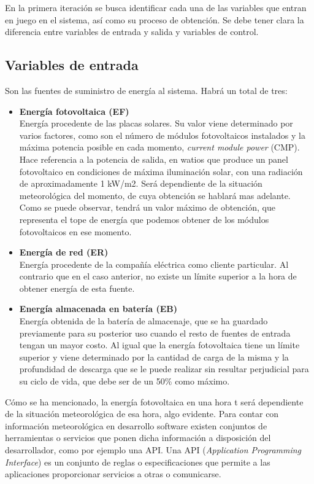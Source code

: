 En la primera iteración se busca identificar cada una de las variables que entran en juego en el sistema, así como su proceso de obtención. Se debe tener clara la diferencia entre variables de entrada y salida y variables de control.
\subsection{Variables de entrada}
Son las fuentes de suministro de energía al sistema. Habrá un total de tres:
\begin{itemize}
	\item \textbf{Energía fotovoltaica (EF)}\\ Energía procedente de las placas solares. Su valor viene determinado por varios factores, como son el número de módulos fotovoltaicos instalados y la máxima potencia posible en cada momento, \textit{current module power} (CMP). Hace referencia a la potencia de salida, en watios que produce un panel fotovoltaico en condiciones de máxima iluminación solar, con una radiación de aproximadamente 1 kW/m2. Será dependiente de la situación meteorológica del momento, de cuya obtención se hablará mas adelante. Como se puede observar, tendrá un valor máximo de obtención, que representa el tope de energía que podemos obtener de los módulos fotovoltaicos en ese momento.
	\item \textbf{Energía de red (ER)}\\ Energía procedente de la compañía eléctrica como cliente particular. Al contrario que en el caso anterior, no existe un límite superior a la hora de obtener energía de esta fuente.
	\item \textbf{Energía almacenada en batería (EB)}\\ Energía obtenida de la batería de almacenaje, que se ha guardado previamente para su posterior uso cuando el resto de fuentes de entrada tengan un mayor costo. Al igual que la energía fotovoltaica tiene un límite superior y viene determinado por la cantidad de carga de la misma y la profundidad de descarga que se le puede realizar sin resultar perjudicial para su ciclo de vida, que debe ser de un 50\% como máximo.
\end{itemize}

Cómo se ha mencionado, la energía fotovoltaica en una hora t será dependiente de la situación meteorológica de esa hora, algo evidente. Para contar con información meteorológica en desarrollo software existen conjuntos de herramientas o servicios que ponen dicha información a disposición del desarrollador, como por ejemplo una API. Una API (\textit{Application Programming Interface}) es un conjunto de reglas o especificaciones que permite a las aplicaciones proporcionar servicios a otras o comunicarse.\\

